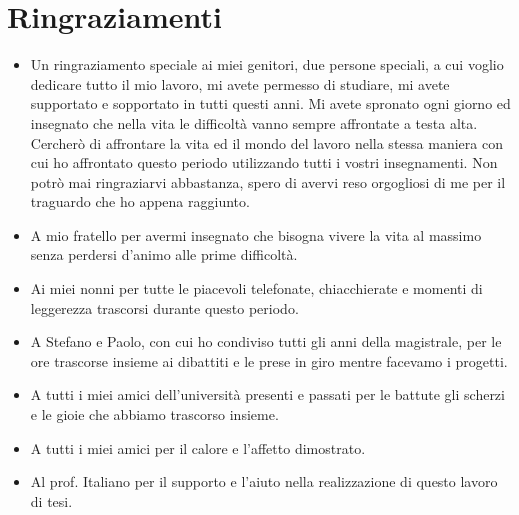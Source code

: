 \chapter*{Ringraziamenti}

\begin{itemize}
\item Un ringraziamento speciale ai miei genitori, due persone speciali,  a cui voglio dedicare tutto il mio lavoro, mi avete permesso di studiare, mi avete supportato e sopportato in tutti questi anni. Mi avete spronato ogni giorno ed insegnato che nella vita le difficoltà vanno sempre affrontate a testa alta. Cercherò di affrontare la vita ed il mondo del lavoro nella stessa maniera con cui ho affrontato questo periodo utilizzando tutti i vostri insegnamenti. Non potrò mai ringraziarvi abbastanza, spero di avervi reso orgogliosi di me per il traguardo che ho appena raggiunto.

\item A mio fratello per avermi insegnato che bisogna vivere la vita al massimo senza perdersi d'animo alle prime difficoltà.


\item Ai miei nonni per tutte le piacevoli telefonate, chiacchierate e momenti di leggerezza trascorsi durante questo periodo.

\item A Stefano e Paolo, con cui ho condiviso tutti gli anni della magistrale, per le ore trascorse insieme ai dibattiti  e le prese in giro mentre facevamo i progetti.

\item A tutti i miei amici dell'università presenti e passati per le battute gli scherzi e le gioie che abbiamo trascorso insieme.

\item A tutti i miei amici per il calore e l'affetto dimostrato.

\item Al prof. Italiano per il supporto e l'aiuto nella realizzazione di questo lavoro di tesi.
\end{itemize}
